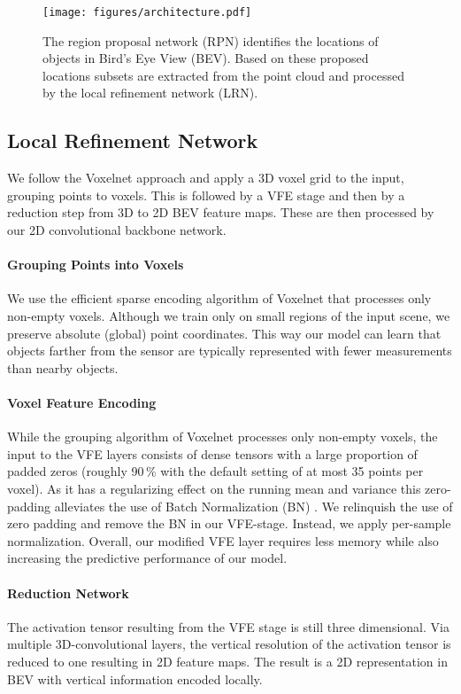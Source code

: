 \documentclass{article}
\begin{document}
\begin{figure*}[ht!]
\centering
\texttt{[image: figures/architecture.pdf]} 
\caption{The region proposal network (RPN) identifies the  locations of objects in Bird's Eye View (BEV). Based on these proposed locations subsets are extracted from the point cloud and processed by the local refinement network (LRN).}
\label{fig:architecture}
\end{figure*}

\subsection{Local Refinement Network} \label{sec:lrn}
We follow the Voxelnet approach and apply a 3D voxel grid to the input, grouping points to voxels. 
This is followed by a VFE stage and then by a reduction step from 3D to 2D BEV feature maps. 
These are then processed by our 2D convolutional backbone network. 

\paragraph{Grouping Points into Voxels}
We use the efficient sparse encoding algorithm of Voxelnet that processes only non-empty voxels. Although we train only on small regions of the input scene, we preserve absolute (global) point coordinates. This way our model can learn that objects farther from the sensor are typically represented with fewer measurements than nearby objects. 

\paragraph{Voxel Feature Encoding}
While the grouping algorithm of Voxelnet processes only non-empty voxels, the input to the VFE layers consists of dense tensors with a large proportion of padded zeros (roughly 90\,\% with the default setting of at most 35 points per voxel). 
As it has a regularizing effect on the running mean and variance this zero-padding alleviates the use of Batch Normalization (BN) \cite{Ioffe2015batchnorm}. 
We relinquish the use of zero padding and remove the BN in our VFE-stage. 
Instead, we apply per-sample normalization. Overall, our modified VFE layer requires less memory while also increasing the predictive performance of our model.

\paragraph{Reduction Network}
The activation tensor resulting from the VFE stage is still three dimensional.
Via multiple 3D-convolutional layers, the vertical resolution of the activation tensor is reduced to one resulting in 2D feature maps. The result is a 2D representation in BEV with vertical information encoded locally.
\end{document}
